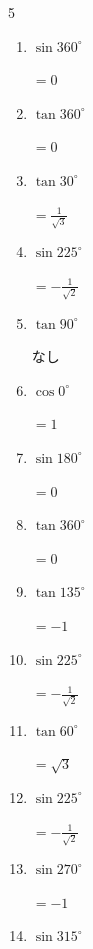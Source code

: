 \begin{multicols}{5}
\begin{enumerate}
  \item $\displaystyle \sin{360^\circ}$

        $\displaystyle =0$

  \item $\displaystyle \tan{360^\circ}$

        $\displaystyle =0$

  \item $\displaystyle \tan{30^\circ}$

        $\displaystyle =\frac{1}{\sqrt{3}}$

  \item $\displaystyle \sin{225^\circ}$

        $\displaystyle =-\frac{1}{\sqrt{2}}$

  \item $\displaystyle \tan{90^\circ}$

        $\displaystyle なし$

  \item $\displaystyle \cos{0^\circ}$

        $\displaystyle =1$

  \item $\displaystyle \sin{180^\circ}$

        $\displaystyle =0$

  \item $\displaystyle \tan{360^\circ}$

        $\displaystyle =0$

  \item $\displaystyle \tan{135^\circ}$

        $\displaystyle =-1$

  \item $\displaystyle \sin{225^\circ}$

        $\displaystyle =-\frac{1}{\sqrt{2}}$

  \item $\displaystyle \tan{60^\circ}$

        $\displaystyle =\sqrt{3}$

\columnbreak %

  \item $\displaystyle \sin{225^\circ}$

        $\displaystyle =-\frac{1}{\sqrt{2}}$

  \item $\displaystyle \sin{270^\circ}$

        $\displaystyle =-1$

  \item $\displaystyle \sin{315^\circ}$


\end{enumerate}
\end{multicols}
